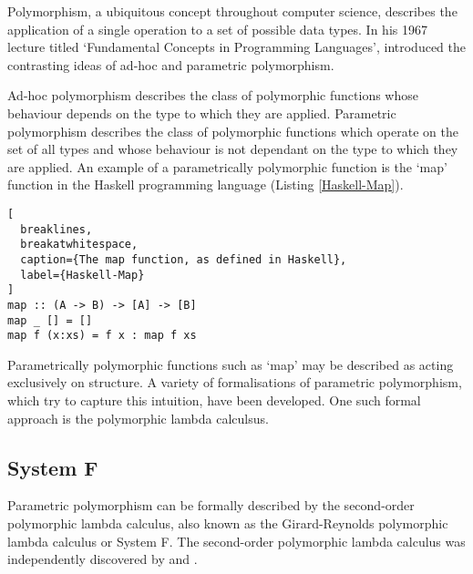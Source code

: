 \documentclass[../../Dissertation.tex]{subfiles}
\begin{document}
Polymorphism, a ubiquitous concept throughout computer science, describes the application of a single operation to a set of possible data types. In his 1967 lecture titled `Fundamental Concepts in Programming Languages',  introduced the contrasting ideas of ad-hoc and parametric polymorphism.
\par
Ad-hoc polymorphism describes the class of polymorphic functions whose behaviour depends on the type to which they are applied. Parametric polymorphism describes the class of polymorphic functions which operate on the set of all types and whose behaviour is not dependant on the type to which they are applied. An example of a parametrically polymorphic function is the `map' function in the Haskell programming language (Listing \ref{Haskell-Map}).
\begin{lstlisting}[
  breaklines,
  breakatwhitespace,
  caption={The map function, as defined in Haskell},
  label={Haskell-Map}
]
map :: (A -> B) -> [A] -> [B]
map _ [] = []
map f (x:xs) = f x : map f xs
\end{lstlisting}
Parametrically polymorphic functions such as `map' may be described as acting exclusively on structure. A variety of formalisations of parametric polymorphism, which try to capture this intuition, have been developed. One such formal approach is the polymorphic lambda calculsus.

\subsection{System F}
Parametric polymorphism can be formally described by the second-order polymorphic lambda calculus, also known as the Girard-Reynolds polymorphic lambda calculus or System F. The second-order polymorphic lambda calculus was independently discovered by  and .
\end{document}
